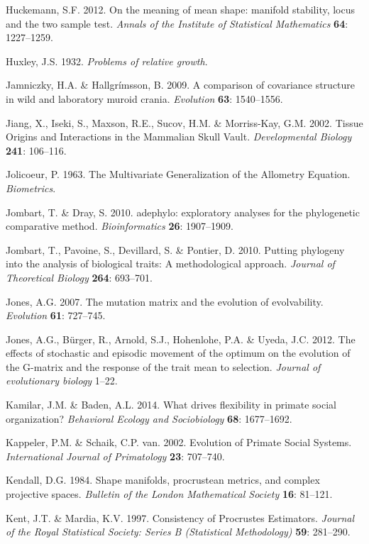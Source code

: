 \documentclass[12pt,twoside]{report}
\begin{document}
Huckemann, S.F. 2012. On the meaning of mean shape: manifold stability,
locus and the two sample test. \emph{Annals of the Institute of
Statistical Mathematics} \textbf{64}: 1227--1259.

Huxley, J.S. 1932. \emph{Problems of relative growth}.

Jamniczky, H.A. \& Hallgrímsson, B. 2009. A comparison of covariance
structure in wild and laboratory muroid crania. \emph{Evolution}
\textbf{63}: 1540--1556.

Jiang, X., Iseki, S., Maxson, R.E., Sucov, H.M. \& Morriss-Kay, G.M.
2002. Tissue Origins and Interactions in the Mammalian Skull Vault.
\emph{Developmental Biology} \textbf{241}: 106--116.

Jolicoeur, P. 1963. The Multivariate Generalization of the Allometry
Equation. \emph{Biometrics}.

Jombart, T. \& Dray, S. 2010. adephylo: exploratory analyses for the
phylogenetic comparative method. \emph{Bioinformatics} \textbf{26}:
1907--1909.

Jombart, T., Pavoine, S., Devillard, S. \& Pontier, D. 2010. Putting
phylogeny into the analysis of biological traits: A methodological
approach. \emph{Journal of Theoretical Biology} \textbf{264}: 693--701.

Jones, A.G. 2007. The mutation matrix and the evolution of evolvability.
\emph{Evolution} \textbf{61}: 727--745.

Jones, A.G., Bürger, R., Arnold, S.J., Hohenlohe, P.A. \& Uyeda, J.C.
2012. The effects of stochastic and episodic movement of the optimum on
the evolution of the G-matrix and the response of the trait mean to
selection. \emph{Journal of evolutionary biology} 1--22.

Kamilar, J.M. \& Baden, A.L. 2014. What drives flexibility in primate
social organization? \emph{Behavioral Ecology and Sociobiology}
\textbf{68}: 1677--1692.

Kappeler, P.M. \& Schaik, C.P. van. 2002. Evolution of Primate Social
Systems. \emph{International Journal of Primatology} \textbf{23}:
707--740.

Kendall, D.G. 1984. Shape manifolds, procrustean metrics, and complex
projective spaces. \emph{Bulletin of the London Mathematical Society}
\textbf{16}: 81--121.

Kent, J.T. \& Mardia, K.V. 1997. Consistency of Procrustes Estimators.
\emph{Journal of the Royal Statistical Society: Series B (Statistical
Methodology)} \textbf{59}: 281--290.
\end{document}
